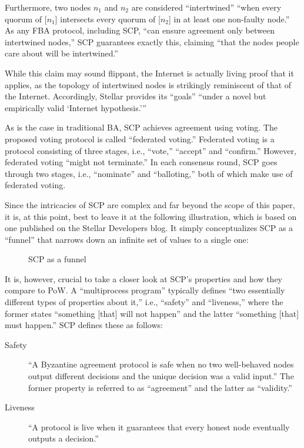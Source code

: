 Furthermore, two nodes $n_1$ and $n_2$ are considered ``intertwined'' ``when every quorum of [$n_1$] intersects every quorum of [$n_2$] in at least one non-faulty node.'' \autocite[4]{lokhava2019}
As any FBA protocol, including SCP, ``can ensure agreement only between intertwined nodes,'' SCP guarantees exactly this, claiming ``that the nodes people care about will be intertwined.'' \autocite[4]{lokhava2019}

While this claim may sound flippant, the Internet is actually living proof that it applies, as the topology of intertwined nodes is strikingly reminiscent of that of the Internet.
Accordingly, Stellar provides its ``goals'' \enquote{under a novel but empirically valid \enquote{Internet hypothesis.}} \autocite[1]{lokhava2019}

As is the case in traditional BA, SCP achieves agreement using voting.
The proposed voting protocol is called ``federated voting.''
Federated voting is a protocol consisting of three stages, i.e., ``vote,'' ``accept'' and ``confirm.'' \autocite[6]{lokhava2019}
However, federated voting ``might not terminate.'' \autocite[6]{lokhava2019}
In each consensus round, SCP goes through two stages, i.e., ``nominate'' and ``balloting,'' both of which make use of federated voting. \autocite[5, 6]{lokhava2019}

Since the intricacies of SCP are complex and far beyond the scope of this paper, it is, at this point, best to leave it at the following illustration, which is based on one published on the Stellar Developers blog. \autocite{stellar2019intuitivescp}
It simply conceptualizes SCP as a ``funnel'' that narrows down an infinite set of values to a single one:
\\
\begin{figure}[H]
	\centering
	
	\caption*{SCP as a funnel \autocite{stellar2019intuitivescp}}
\end{figure}

It is, however, crucial to take a closer look at SCP's properties and how they compare to PoW.
A ``multiprocess program'' typically defines ``two essentially different types of properties about it,'' i.e., ``safety'' and ``liveness,'' where the former states ``something [that] will not happen'' and the latter ``something [that] must happen.'' \autocite[125]{lamport1977}
SCP defines these as follows:
 
\begin{description}
	\item[Safety]
		``A Byzantine agreement protocol is safe when no two well-behaved nodes output different decisions and the unique decision was a valid input.'' \autocite[3]{lokhava2019}
		The former property is referred to as ``agreement'' and the latter as ``validity.'' \autocite{mazieres2019safetyvsliveness}
	\item[Liveness]
		``A protocol is live when it guarantees that every honest node eventually outputs a decision.'' \autocite[4]{lokhava2019}
\end{description}

